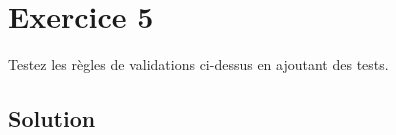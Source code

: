 \begin{english}

\begin{Shaded}
\begin{Highlighting}[]

 \NormalTok{ \textless{} }\NormalTok{::}
\NormalTok{, }
\NormalTok{, }\NormalTok{\{ }\NormalTok{ \}}
\end{Highlighting}
\end{Shaded}

\end{english}

\hypertarget{exercice-5}{%
\section{Exercice 5}\label{exercice-5}}

Testez les règles de validations ci-dessus en ajoutant des tests.

\begin{english}

\begin{Shaded}
\begin{Highlighting}[]
\NormalTok{$ }
\NormalTok{$ }
\NormalTok{$ }
\end{Highlighting}
\end{Shaded}

\end{english}

\hypertarget{solution-1}{%
\subsection{Solution}\label{solution-1}}

